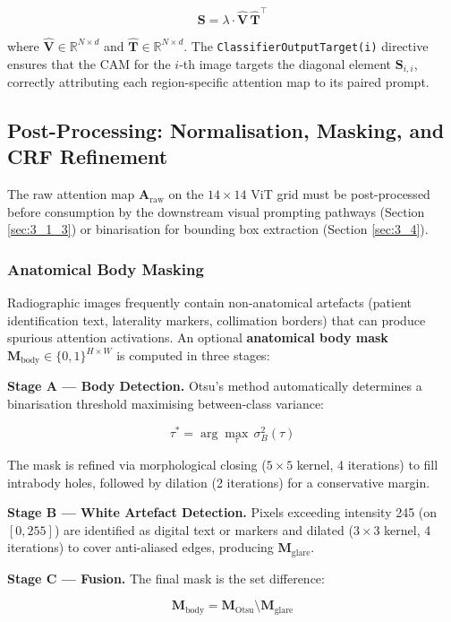 $$
\mathbf{S} = \lambda \cdot \hat{\mathbf{V}} \, \hat{\mathbf{T}}^{\top}
$$

where $\hat{\mathbf{V}} \in \mathbb{R}^{N \times d}$ and $\hat{\mathbf{T}} \in \mathbb{R}^{N \times d}$. The \texttt{ClassifierOutputTarget(i)} directive ensures that the CAM for the $i$-th image targets the diagonal element $\mathbf{S}_{i,i}$, correctly attributing each region-specific attention map to its paired prompt.

\subsection{Post-Processing: Normalisation, Masking, and CRF Refinement}

The raw attention map $\mathbf{A}_{\text{raw}}$ on the $14 \times 14$ ViT grid must be post-processed before consumption by the downstream visual prompting pathways (Section \ref{sec:3_1_3}) or binarisation for bounding box extraction (Section \ref{sec:3_4}).

\subsubsection{Anatomical Body Masking}


Radiographic images frequently contain non-anatomical artefacts (patient identification text, laterality markers, collimation borders) that can produce spurious attention activations. An optional \textbf{anatomical body mask} $\mathbf{M}_{\text{body}} \in \{0, 1\}^{H \times W}$ is computed in three stages:

\textbf{Stage A --- Body Detection.} Otsu's method automatically determines a binarisation threshold maximising between-class variance:

$$
\tau^{*} = \arg\max_{\tau} \, \sigma^2_B(\tau)
$$

The mask is refined via morphological closing ($5 \times 5$ kernel, 4 iterations) to fill intrabody holes, followed by dilation (2 iterations) for a conservative margin.

\textbf{Stage B --- White Artefact Detection.} Pixels exceeding intensity 245 (on $[0, 255]$) are identified as digital text or markers and dilated ($3 \times 3$ kernel, 4 iterations) to cover anti-aliased edges, producing $\mathbf{M}_{\text{glare}}$.

\textbf{Stage C --- Fusion.} The final mask is the set difference:

$$
\mathbf{M}_{\text{body}} = \mathbf{M}_{\text{Otsu}} \setminus \mathbf{M}_{\text{glare}}
$$

